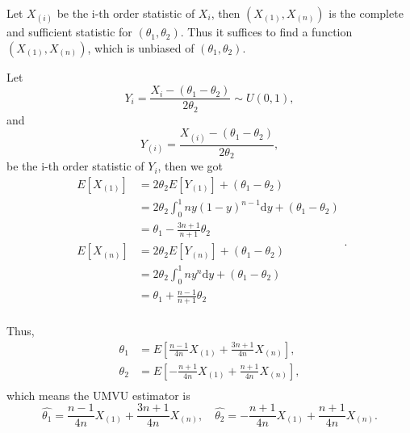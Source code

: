 \begin{solution}
    Let $X_{(i)}$ be the i-th order statistic of $X_i$, then $\left(X_{(1)},X_{(n)}\right)$ is the complete and sufficient statistic for $(\theta_1,\theta_2)$. Thus it suffices to find a function $\left(X_{(1)},X_{(n)}\right)$, which is unbiased of $(\theta_1,\theta_2)$.

    Let
    \begin{equation*}
        Y_i=\frac{X_i-(\theta_1-\theta_2)}{2\theta_2}\sim U(0,1),
    \end{equation*}
    and
    \begin{equation*}
        Y_{(i)}=\frac{X_{(i)}-(\theta_1-\theta_2)}{2\theta_2},
    \end{equation*}
    be the i-th order statistic of $Y_i$, then we got
    \begin{equation*}
        \begin{aligned}
            E[X_{(1)}] &= 2\theta_2E[Y_{(1)}]+(\theta_1-\theta_2) \\
            &= 2\theta_2\int_{0}^{1}ny(1-y)^{n-1}\mathrm{d}y+(\theta_1-\theta_2) \\
            &= \theta_1-\frac{3n+1}{n+1}\theta_2 \\
            E[X_{(n)}] &= 2\theta_2E[Y_{(n)}]+(\theta_1-\theta_2) \\
            &= 2\theta_2\int_{0}^{1}ny^{n}\mathrm{d}y+(\theta_1-\theta_2) \\
            &= \theta_1+\frac{n-1}{n+1}\theta_2 \\
        \end{aligned}.
    \end{equation*}

    Thus,
    \begin{equation*}
        \begin{aligned}
            \theta_1 &= E\left[\frac{n-1}{4n}X_{(1)}+\frac{3n+1}{4n}X_{(n)}\right], \\
            \theta_2 &= E\left[-\frac{n+1}{4n}X_{(1)}+\frac{n+1}{4n}X_{(n)}\right], \\
        \end{aligned}
    \end{equation*}
    which means the UMVU estimator is
    \begin{equation*}
        \hat{\theta_1}=\frac{n-1}{4n}X_{(1)}+\frac{3n+1}{4n}X_{(n)},\quad\hat{\theta_2}=-\frac{n+1}{4n}X_{(1)}+\frac{n+1}{4n}X_{(n)}.
    \end{equation*}
\end{solution}
